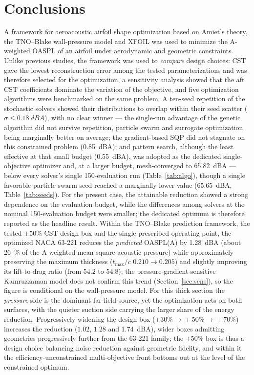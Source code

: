 \documentclass[preprint,3p,times]{elsarticle}
\begin{document}
\FloatBarrier
\section{Conclusions}\label{sec:concl}
A framework for aeroacoustic airfoil shape optimization based on Amiet's theory,
the TNO--Blake wall-pressure model and XFOIL was used to minimize the A-weighted
OASPL of an airfoil under aerodynamic and geometric constraints. Unlike previous
studies, the framework was used to \emph{compare} design choices: CST gave the
lowest reconstruction error among the tested parameterizations and was therefore
selected for the optimization, a
sensitivity analysis showed that the aft CST coefficients dominate the variation
of the objective, and five optimization algorithms were benchmarked on the same
problem. A ten-seed repetition of the stochastic solvers showed their
distributions to overlap within their seed scatter ($\sigma\le\SI{0.18}{dBA}$),
with no clear winner --- the single-run advantage of the genetic algorithm did
not survive repetition, particle swarm and surrogate optimization being
marginally better on average;
the gradient-based SQP did not stagnate on this constrained problem
(\SI{0.85}{dBA}); and pattern search, although the least effective at that
small budget (\SI{0.55}{dBA}), was adopted as the dedicated single-objective
optimizer and, at a larger budget, mesh-converged to \SI{65.82}{dBA} --- below
every solver's single 150-evaluation run (Table~\ref{tab:algo}), though a
single favorable particle-swarm seed reached a marginally lower value
(\SI{65.65}{dBA}, Table~\ref{tab:seeds}). For the present case, the attainable reduction showed a
strong dependence on the evaluation budget, while the differences among
solvers at the nominal 150-evaluation budget were smaller; the dedicated
optimum is therefore reported as the headline result. Within the TNO--Blake
prediction framework, the tested
$\pm50\%$ CST design box and the single prescribed operating point, the
optimized NACA 63-221 reduces the \emph{predicted} OASPL(A) by
\SI{1.28}{dBA} (about \SI{26}{\percent} of the A-weighted mean-square
acoustic pressure) while approximately preserving the maximum thickness
($t_{\max}/c$ $0.210\!\to\!0.205$) and slightly improving its lift-to-drag
ratio (from $54.2$ to $54.8$); the pressure-gradient-sensitive Kamruzzaman
model does not confirm this trend (Section~\ref{sec:sens}), so the figure is
conditional on the wall-pressure model. For this thick section the \emph{pressure} side is the
dominant far-field source, yet the optimization acts on both surfaces, with the
quieter suction side carrying the larger share of the energy reduction.
Progressively widening the design box
($\pm30\%\!\to\!\pm50\%\!\to\!\pm70\%$) increases the reduction ($1.02$, $1.28$
and \SI{1.74}{dBA}), wider boxes admitting geometries progressively further
from the 63-221 family; the $\pm50\%$ box is thus a design choice balancing
noise reduction against geometric fidelity, and within it the
efficiency-unconstrained multi-objective front bottoms out at the level of the
constrained optimum.
\end{document}

